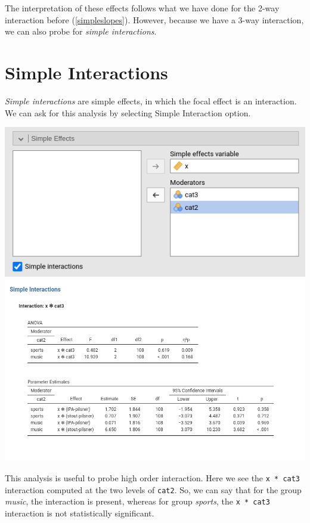 \documentclass[
]{book}
\begin{document}
The interpretation of these effects follows what we have done for the 2-way interaction before (\ref{simpleslopes}). However, because we have a 3-way interaction, we can also probe for \emph{simple interactions}.

\hypertarget{simpleinteractions}{%
\section{Simple Interactions}\label{simpleinteractions}}

\emph{Simple interactions} are simple effects, in which the focal effect is an interaction. We can ask for this analysis by selecting {Simple Interaction} option.

\includegraphics{bookletpics/2_ancova_input6.png}
\includegraphics{bookletpics/2_ancova_output6.png}

This analysis is useful to probe high order interaction. Here we see the \texttt{x\ *\ cat3} interaction computed at the two levels of \texttt{cat2}. So, we can say that for the group \emph{music}, the interaction is present, whereas for group \emph{sports}, the \texttt{x\ *\ cat3} interaction is not statistically significant.
\end{document}
